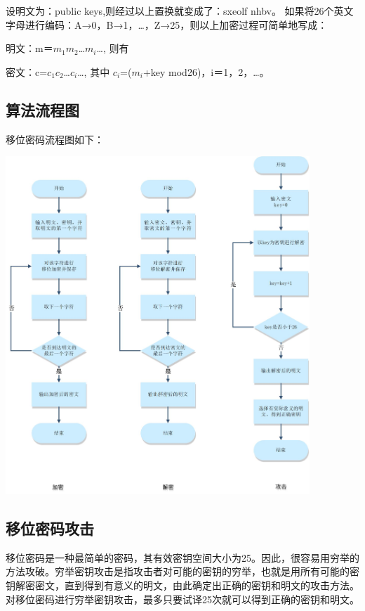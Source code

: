 \documentclass[UTF8,a4paper]{article}
\begin{document}
	设明文为：public keys,则经过以上置换就变成了：sxeolf nhbv。
	如果将26个英文字母进行编码：A→0，B→1，…，Z→25，则以上加密过程可简单地写成：\par 
	明文：m＝$m_1$$m_2$…$m_i$…, 则有\par 
	密文：c=$c_1$$c_2$…$c_i$…, 其中 $c_i$=($m_i$+key mod26)，i＝1，2，…。\par 
	

	\subsection{算法流程图}
	移位密码流程图如下：\par 
	\newpage
		\begin{center}
	
		\includegraphics[width=0.86\textwidth]{first.JPG}
	\end{center}

	\subsection{移位密码攻击}
	移位密码是一种最简单的密码，其有效密钥空间大小为25。因此，很容易用穷举的方法攻破。穷举密钥攻击是指攻击者对可能的密钥的穷举，也就是用所有可能的密钥解密密文，直到得到有意义的明文，由此确定出正确的密钥和明文的攻击方法。对移位密码进行穷举密钥攻击，最多只要试译25次就可以得到正确的密钥和明文。\par 
\end{document}
